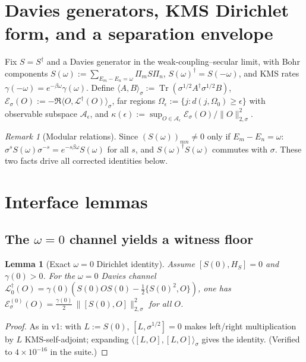 \documentclass[11pt]{article}
\newtheorem{lemma}[theorem]{Lemma}
\theoremstyle{remark}
\newtheorem{remark}[theorem]{Remark}
\newcommand{\Tr}{\operatorname{Tr}}
\newcommand{\kms}[1]{\|#1\|_{2,\sigma}}
\begin{document}
\section{Davies generators, KMS Dirichlet form, and a separation envelope}
Fix $S = S^\dagger$ and a Davies generator in the weak-coupling--secular
limit, with Bohr components $S(\omega) := \sum_{E_m - E_n = \omega} \Pi_m S
\Pi_n$, $S(\omega)^\dagger = S(-\omega)$, and KMS rates $\gamma(-\omega) =
e^{-\beta\omega}\gamma(\omega)$. Define $\langle A, B\rangle_\sigma :=
\Tr(\sigma^{1/2}A^\dagger \sigma^{1/2} B)$,
$\mathcal{E}_\sigma(O) := -\Re\langle O, \mathcal{L}^\dagger(O)
\rangle_\sigma$, far regions $\Omega_\epsilon := \{j : d(j, \Omega_0) \ge
\epsilon\}$ with observable subspace $\mathcal{A}_\epsilon$, and
$\kappa(\epsilon) := \sup_{O \in \mathcal{A}_\epsilon}
\mathcal{E}_\sigma(O)/\kms{O}^2$.
\begin{remark}[Modular relations]
\label{rem:modular}
Since $(S(\omega))_{mn} \neq 0$ only if $E_m - E_n = \omega$:
$\sigma^s S(\omega) \sigma^{-s} = e^{-s\beta\omega} S(\omega)$ for all $s$,
and $S(\omega)^\dagger S(\omega)$ commutes with $\sigma$. These two facts
drive all corrected identities below.
\end{remark}

\section{Interface lemmas}
\subsection{The $\omega = 0$ channel yields a witness floor}
\begin{lemma}[Exact $\omega = 0$ Dirichlet identity]
\label{lem:omega0}
Assume $[S(0), H_S] = 0$ and $\gamma(0) > 0$. For the $\omega = 0$ Davies
channel $\mathcal{L}_0^\dagger(O) = \gamma(0)(S(0)OS(0) -
\tfrac12\{S(0)^2, O\})$, one has $\mathcal{E}^{(0)}_\sigma(O) =
\tfrac{\gamma(0)}{2}\, \kms{[S(0), O]}^2$ for all $O$.
\end{lemma}
\begin{proof}
As in v1: with $L := S(0)$, $[L, \sigma^{1/2}] = 0$ makes left/right
multiplication by $L$ KMS-self-adjoint; expanding
$\langle[L,O],[L,O]\rangle_\sigma$ gives the identity. (Verified to
$4\times10^{-16}$ in the suite.)
\end{proof}
\end{document}
